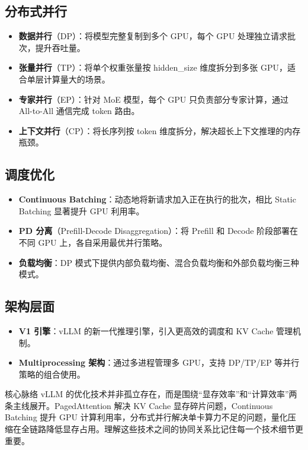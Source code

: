 \documentclass[a4paper]{article}
\begin{document}
\subsection{分布式并行}
\begin{itemize}
    \item \textbf{数据并行}（DP）：将模型完整复制到多个 GPU，每个 GPU 处理独立请求批次，提升吞吐量。
    \item \textbf{张量并行}（TP）：将单个权重张量按 hidden\_size 维度拆分到多张 GPU，适合单层计算量大的场景。
    \item \textbf{专家并行}（EP）：针对 MoE 模型，每个 GPU 只负责部分专家计算，通过 All-to-All 通信完成 token 路由。
    \item \textbf{上下文并行}（CP）：将长序列按 token 维度拆分，解决超长上下文推理的内存瓶颈。
\end{itemize}

\subsection{调度优化}
\begin{itemize}
    \item \textbf{Continuous Batching}：动态地将新请求加入正在执行的批次，相比 Static Batching 显著提升 GPU 利用率。
    \item \textbf{PD 分离}（Prefill-Decode Disaggregation）：将 Prefill 和 Decode 阶段部署在不同 GPU 上，各自采用最优并行策略。
    \item \textbf{负载均衡}：DP 模式下提供内部负载均衡、混合负载均衡和外部负载均衡三种模式。
\end{itemize}

\subsection{架构层面}
\begin{itemize}
    \item \textbf{V1 引擎}：vLLM 的新一代推理引擎，引入更高效的调度和 KV Cache 管理机制。
    \item \textbf{Multiprocessing 架构}：通过多进程管理多 GPU，支持 DP/TP/EP 等并行策略的组合使用。
\end{itemize}

\begin{importantbox}{核心脉络}
    vLLM 的优化技术并非孤立存在，而是围绕``显存效率''和``计算效率''两条主线展开。PagedAttention 解决 KV Cache 显存碎片问题，Continuous Batching 提升 GPU 计算利用率，分布式并行解决单卡算力不足的问题，量化压缩在全链路降低显存占用。理解这些技术之间的协同关系比记住每一个技术细节更重要。
\end{importantbox}
\end{document}
